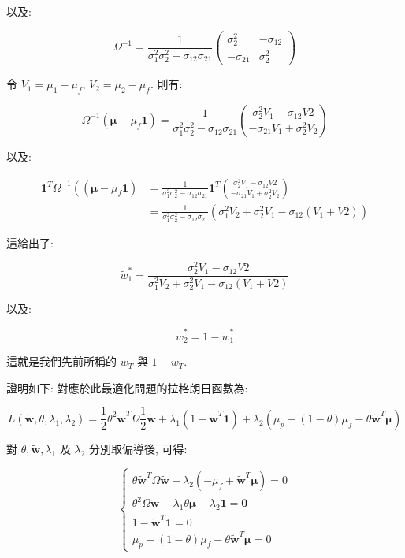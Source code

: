 \documentclass[letterpaper]{article}
\begin{document}
		以及: 
		
		$$
		\Omega^{-1}=\frac{1}{\sigma_{1}^{2} \sigma_{2}^{2}-\sigma_{12} \sigma_{21}}\left (\begin{array}{cc}
			\sigma_{2}^{2} & -\sigma_{12} \\
			-\sigma_{21} & \sigma_{2}^{2}
		\end{array}\right) 
		$$
		
		令 $V_{1}=\mu_{1}-\mu_{f}$, $V_{2}=\mu_{2}-\mu_{f}$. 則有: 
		
		
		$$
		\Omega^{-1}\left (\boldsymbol{\mu}-\mu_{f} \mathbf{1}\right) =\frac{1}{\sigma_{1}^{2} \sigma_{2}^{2}-\sigma_{12} \sigma_{21}}\binom{\sigma_{2}^{2} V_{1}-\sigma_{12} V 2}{-\sigma_{21} V_{1}+\sigma_{2}^{2} V_{2}}
		$$
		
		以及: 
		
		$$
		\begin{aligned}
			\mathbf{1}^{T} \Omega^{-1}\left (\left (\boldsymbol{\mu}-\mu_{f} \mathbf{1}\right) \right. & =\frac{1}{\sigma_{1}^{2} \sigma_{2}^{2}-\sigma_{12} \sigma_{21}} \mathbf{1}^{T}\binom{\sigma_{2}^{2} V_{1}-\sigma_{12} V 2}{-\sigma_{21} V_{1}+\sigma_{2}^{2} V_{2}} \\
			& =\frac{1}{\sigma_{1}^{2} \sigma_{2}^{2}-\sigma_{12} \sigma_{21}}\left (\sigma_{1}^{2} V_{2}+\sigma_{2}^{2} V_{1}-\sigma_{12}\left (V_{1}+V 2\right) \right) 
		\end{aligned}
		$$
		
		這給出了: 
		
		$$
		\tilde{w}_{1}^{*}=\frac{\sigma_{2}^{2} V_{1}-\sigma_{12} V 2}{\sigma_{1}^{2} V_{2}+\sigma_{2}^{2} V_{1}-\sigma_{12}\left (V_{1}+V 2\right) }
		$$
		
		以及: 
		
		$$
		\tilde{w}_{2}^{*}=1-\tilde{w}_{1}^{*}
		$$
		
		這就是我們先前所稱的 $w_{T}$ 與 $1-w_{T}$. 
		
		證明如下: 對應於此最適化問題的拉格朗日函數為: 
		
		
		$$
		L\left (\tilde{\mathbf{w}}, \theta, \lambda_{1}, \lambda_{2}\right) =\frac{1}{2} \theta^{2} \tilde{\mathbf{w}}^{T} \Omega \frac{1}{2} \tilde{\mathbf{w}}+\lambda_{1}\left (1-\tilde{\mathbf{w}}^{T} \mathbf{1}\right) +\lambda_{2}\left (\mu_{p}- (1-\theta) \mu_{f}-\theta \tilde{\mathbf{w}}^{T} \boldsymbol{\mu}\right) 
		$$
		
		對 $\theta, \tilde{\mathbf{w}}, \lambda_{1}$ 及 $\lambda_{2}$ 分別取偏導後, 可得: 
		
		
		$$
		\left\{\begin{array}{l}
			\theta \tilde{\mathbf{w}}^{T} \Omega \tilde{\mathbf{w}}-\lambda_{2}\left (-\mu_{f}+\tilde{\mathbf{w}}^{T} \boldsymbol{\mu}\right) =0 \\
			\theta^{2} \Omega \tilde{\mathbf{w}}-\lambda_{1} \theta \boldsymbol{\mu}-\lambda_{2} \mathbf{1}=\mathbf{0} \\
			1-\tilde{\mathbf{w}}^{T} \mathbf{1}=0 \\
			\mu_{p}- (1-\theta) \mu_{f}-\theta \tilde{\mathbf{w}}^{T} \boldsymbol{\mu}=0
		\end{array}\right.
		$$
		
\end{document}
